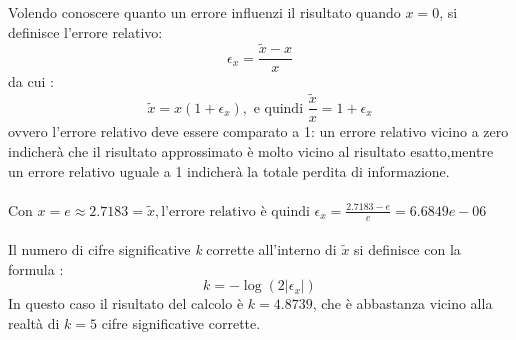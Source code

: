 Volendo conoscere quanto un errore influenzi il risultato quando $x=0$, si definisce l’errore relativo:
	\[
	\epsilon_x = \frac{\tilde{x}-x}{x} 
	\]
da cui :
	\[
	\tilde{x} = x(1+\epsilon_x), \text{ e quindi } \frac{\tilde{x}}{x} = 1 + \epsilon_x
	\]
ovvero l’errore relativo deve essere comparato a 1: un errore relativo vicino a zero indicherà che il risultato approssimato è molto vicino al risultato esatto,mentre un errore relativo uguale a 1 indicherà la totale perdita di informazione.\\\\
Con $x = e \approx 2.7183 = \tilde{x}, \text{l'errore relativo è quindi } \epsilon_x = \frac{2.7183 - e}{e} = 6.6849e-06$\\\\
Il numero di cifre significative \textit{k} corrette all’interno di $\tilde{x}$ si definisce con la formula :
	\[
	\textit{k} = -\log(2|\epsilon_x|)
	\]
In questo caso il risultato del calcolo è $\textit{k}=4.8739$, che è abbastanza vicino alla realtà di $\textit{k}=5$ cifre significative corrette.